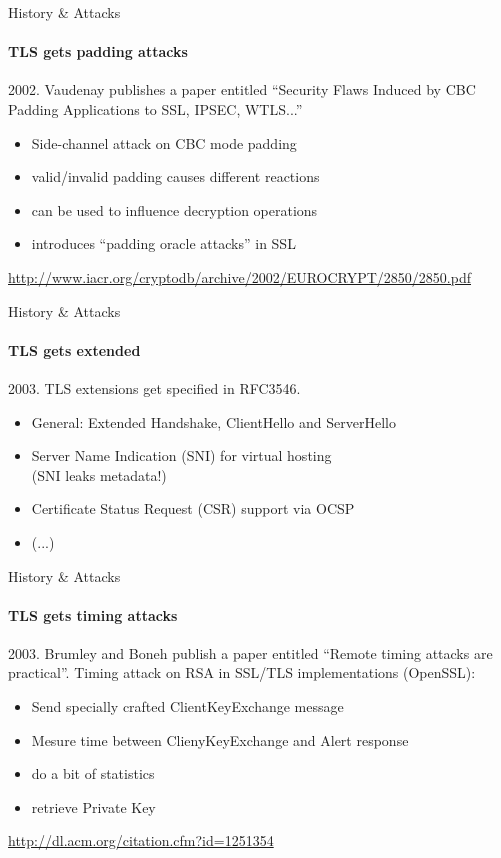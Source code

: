 \documentclass[hyperref={draft}]{beamer}
\begin{document}
\begin{frame}{History \& Attacks}
  \framesubtitle{TLS gets padding attacks}
  2002. Vaudenay publishes a paper entitled ``Security Flaws Induced by CBC Padding
Applications to SSL, IPSEC, WTLS...'' 
  \begin{itemize}
    \item Side-channel attack on CBC mode padding
    \item valid/invalid padding causes different reactions
    \item can be used to influence decryption operations
    \item introduces ``padding oracle attacks'' in SSL
  \end{itemize}

  \vspace{50px}

  \tiny\url{http://www.iacr.org/cryptodb/archive/2002/EUROCRYPT/2850/2850.pdf}
\end{frame}

\begin{frame}{History \& Attacks}
  \framesubtitle{TLS gets extended}
  2003. TLS extensions get specified in RFC3546.
  \begin{itemize}
    \item General: Extended Handshake, ClientHello and ServerHello
    \item Server Name Indication (SNI) for virtual hosting\\(SNI leaks metadata!)
    \item Certificate Status Request (CSR) support via OCSP
    \item (...)
  \end{itemize}
\end{frame}

\begin{frame}{History \& Attacks}
  \framesubtitle{TLS gets timing attacks}
  2003. Brumley and Boneh publish a paper entitled ``Remote timing attacks are practical''.
  \newline
  \newline
  Timing attack on RSA in SSL/TLS implementations (OpenSSL):
  \begin{itemize}
    \item Send specially crafted ClientKeyExchange message
    \item Mesure time between ClienyKeyExchange and Alert response
    \item do a bit of statistics
    \item retrieve Private Key
  \end{itemize}

  \vspace{50px}

  \tiny\url{http://dl.acm.org/citation.cfm?id=1251354}
\end{frame}
\end{document}
